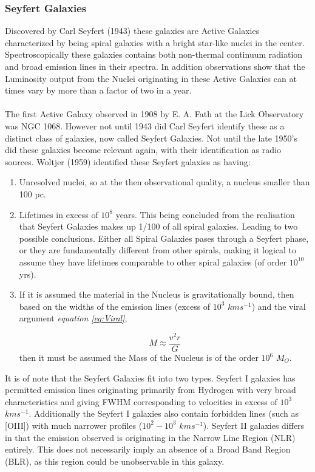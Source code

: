 \documentclass[a4paper, 12pt, twoside]{article}
\begin{document}
\subsubsection{Seyfert Galaxies}
Discovered by Carl Seyfert (1943) these galaxies are Active Galaxies characterized by being spiral galaxies with a bright star-like nuclei in the center. Spectroscopically these galaxies contains both non-thermal continuum radiation and broad emission lines in their spectra. In addition observations show that the Luminosity output from the Nuclei originating in these Active Galaxies can at times vary by more than a factor of two in a year. \\
\\
The first Active Galaxy observed in 1908 by E. A. Fath at the Lick Observatory was NGC 1068. However not until 1943 did Carl Seyfert identify these as a distinct class of galaxies, now called Seyfert Galaxies. Not until the late 1950's did these galaxies become relevant again, with their identification as radio sources. Woltjer (1959) identified these Seyfert galaxies as having:
\begin{enumerate}
\item Unresolved nuclei, so at the then observational quality, a nucleus smaller than 100 pc. 
\item Lifetimes in excess of $10^8$ years. This being concluded from the realisation that Seyfert Galaxies makes up 1/100 of all spiral galaxies. Leading to two possible conclusions. Either all Spiral Galaxies pases through a Seyfert phase, or they are fundamentally different from other spirals, making it logical to assume they have lifetimes comparable to other spiral galaxies (of order $10^{10}$ yrs).
\item If it is assumed the material in the Nucleus is gravitationally bound, then based on the widths of the emission lines (excess of $10^3$ $kms^{-1}$) and the viral argument \emph{equation \ref{eq:Viral}},

\begin{equation}
M \approx \frac{v^2r} {G}
\label{eq:Viral}
\end{equation}
then it must be assumed the Mass of the Nucleus is of the order $10^6$ $M_O$.
\end{enumerate}
It is of note that the Seyfert Galaxies fit into two types. Seyfert I galaxies has permitted emission lines originating primarily from Hydrogen with very broad characteristics and giving FWHM corresponding to velocities in excess of $10^3$ $kms^{-1}$. Additionally the Seyfert I galaxies also contain forbidden lines (such as [OIII]) with much narrower profiles ($10^2-10^3$ $kms^{-1}$). Seyfert II galaxies differs in that the emission observed is originating in the Narrow Line Region (NLR) entirely. This does not necessarily imply an absence of a Broad Band Region (BLR), as this region could be unobservable in this galaxy. \\
\end{document}
